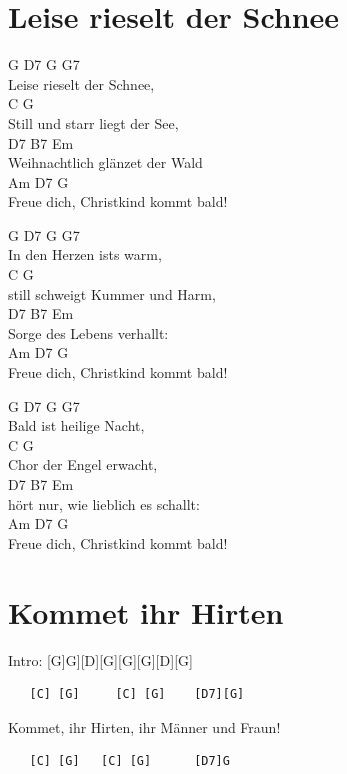 \documentclass[
  letterpaper,
]{scrbook}
\begin{document}
\hypertarget{leise-rieselt-der-schnee}{%
\chapter{Leise rieselt der Schnee}\label{leise-rieselt-der-schnee}}

G D7 G G7\\
Leise rieselt der Schnee,\\
C G\\
Still und starr liegt der See,\\
D7 B7 Em\\
Weihnachtlich glänzet der Wald\\
Am D7 G\\
Freue dich, Christkind kommt bald!

G D7 G G7\\
In den Herzen ist\textquotesingle s warm,\\
C G\\
still schweigt Kummer und Harm,\\
D7 B7 Em\\
Sorge des Lebens verhallt:\\
Am D7 G\\
Freue dich, Christkind kommt bald!

G D7 G G7\\
Bald ist heilige Nacht,\\
C G\\
Chor der Engel erwacht,\\
D7 B7 Em\\
hört nur, wie lieblich es schallt:\\
Am D7 G\\
Freue dich, Christkind kommt bald!

\hypertarget{kommet-ihr-hirten}{%
\chapter{Kommet ihr Hirten}\label{kommet-ihr-hirten}}

Intro: {[}G{]}G{]}{[}D{]}{[}G{]}{[}G{]}{[}G{]}{[}D{]}{[}G{]}

\begin{verbatim}
   [C] [G]     [C] [G]    [D7][G]
\end{verbatim}

Kommet, ihr Hirten, ihr Männer und Fraun!

\begin{verbatim}
   [C] [G]   [C] [G]      [D7]G
\end{verbatim}
\end{document}
